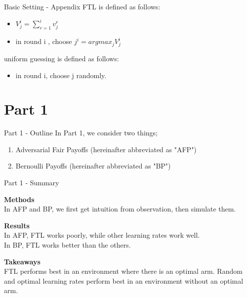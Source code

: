 \documentclass{beamer}
\begin{document}
\begin{frame}{Basic Setting - Appendix}
    FTL is defined as follows:
    \begin{itemize}
        \item $V_j^i = \sum_{r=1}^i v_j^r$
        \item in round i , choose $j^i = argmax_j V_j^i$
    \end{itemize}
    uniform guessing is defined as follows:
    \begin{itemize}
      \item in round i, choose j randomly.
    \end{itemize}
\end{frame}


\section{Part 1}
\begin{frame}{Part 1 - Outline}
In Part 1, we consider two things;
\begin{enumerate}
    \item Adversarial Fair Payoffs (hereinafter abbreviated as "AFP") 
    \item Bernoulli Payoffs (hereinafter abbreviated as "BP")
\end{enumerate}
\end{frame}

\begin{frame}{Part 1 - Summary}

\textbf{Methods}\\
In AFP and BP, we first get intuition from observation, then simulate them.
\vspace{1em}

\textbf{Results}\\
In AFP, FTL works poorly, while other learning rates work well.\\
In BP, FTL works better than the others.
\vspace{1em}

\textbf{Takeaways}\\
FTL performs best in an environment where there is an optimal arm. Random and optimal learning rates perform best in an environment without an optimal arm.

\end{frame}
\end{document}
